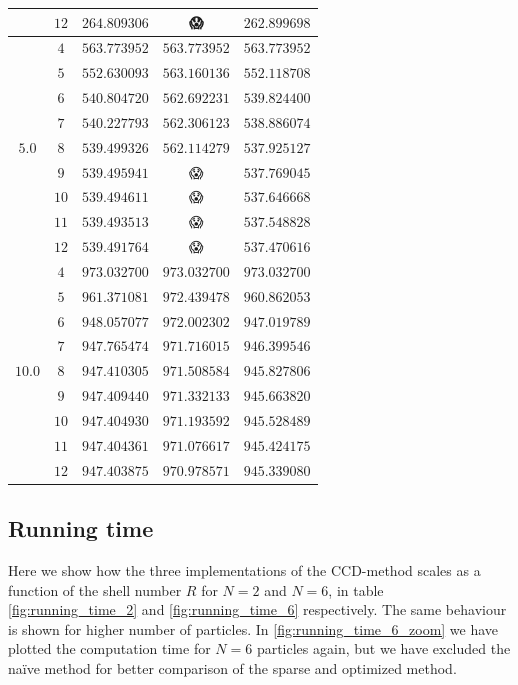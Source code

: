 \documentclass[
    a4paper, aps, twocolumn, floatfix, superscriptaddress,
    nofootinbib]{revtex4-1}
\newcommand{\nan}{{\DejaSans 😱}}
\newcommand{\1}{\mathds{1}}
\begin{document}
\begin{table}
\begin{ruledtabular}
\begin{tabular}{c|c|ccc}
                          & $12$ & $264.809306$ & \nan & $262.899698$ \\
                    \hline
                          & $4$ & $563.773952$ & $563.773952$ & $563.773952$ \\
                          & $5$ & $552.630093$ & $563.160136$ & $552.118708$ \\
                          & $6$ & $540.804720$ & $562.692231$ & $539.824400$ \\
                          & $7$ & $540.227793$ & $562.306123$ & $538.886074$ \\
                    $5.0$ & $8$ & $539.499326$ & $562.114279$ & $537.925127$ \\
                          & $9$ & $539.495941$ & \nan & $537.769045$ \\
                          & $10$ & $539.494611$ & \nan & $537.646668$ \\
                          & $11$ & $539.493513$ & \nan & $537.548828$ \\
                          & $12$ & $539.491764$ & \nan & $537.470616$ \\
                    \hline
                           & $4$ & $973.032700$ & $973.032700$ & $973.032700$ \\
                           & $5$ & $961.371081$ & $972.439478$ & $960.862053$ \\
                           & $6$ & $948.057077$ & $972.002302$ & $947.019789$ \\
                           & $7$ & $947.765474$ & $971.716015$ & $946.399546$ \\
                    $10.0$ & $8$ & $947.410305$ & $971.508584$ & $945.827806$ \\
                           & $9$ & $947.409440$ & $971.332133$ & $945.663820$ \\
                           & $10$ & $947.404930$ & $971.193592$ & $945.528489$ \\
                           & $11$ & $947.404361$ & $971.076617$ & $945.424175$ \\
                           & $12$ & $947.403875$ & $970.978571$ & $945.339080$ \\
                \end{tabular}
            \end{ruledtabular}
            \label{tab:N20}
        \end{table}

    \subsection{Running time}
        Here we show how the three implementations of the CCD-method scales as a
        function of the shell number $R$ for $N = 2$ and $N = 6$, in table
        \ref{fig:running_time_2} and \ref{fig:running_time_6} respectively. The same
        behaviour is shown for higher number of particles. In \autoref{fig:running_time_6_zoom}
        we have plotted the computation time for $N=6$ particles again, but we
        have excluded the naïve method for better comparison of the sparse and
        optimized method.
\end{document}
